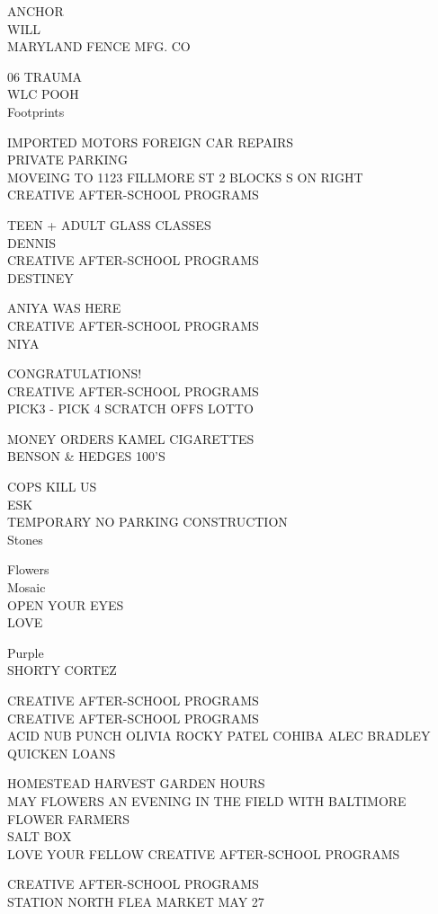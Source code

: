 \documentclass[10pt,letterpaper]{article}
\begin{document}
ANCHOR\\
WILL\\
MARYLAND FENCE MFG. CO

06 TRAUMA\\
WLC POOH\\
Footprints

IMPORTED MOTORS FOREIGN CAR REPAIRS\\
PRIVATE PARKING\\
MOVEING TO 1123 FILLMORE ST 2 BLOCKS S ON RIGHT\\
CREATIVE AFTER{-}SCHOOL PROGRAMS

TEEN + ADULT GLASS CLASSES\\
DENNIS\\
CREATIVE AFTER{-}SCHOOL PROGRAMS\\
DESTINEY

ANIYA WAS HERE\\
CREATIVE AFTER{-}SCHOOL PROGRAMS\\
NIYA

CONGRATULATIONS!\\
CREATIVE AFTER{-}SCHOOL PROGRAMS\\
PICK3 {-} PICK 4 SCRATCH OFFS LOTTO

MONEY ORDERS KAMEL CIGARETTES\\
BENSON \& HEDGES 100'S

COPS KILL US\\
ESK\\
TEMPORARY NO PARKING CONSTRUCTION\\
Stones

Flowers\\
Mosaic\\
OPEN YOUR EYES\\
LOVE

Purple\\
SHORTY CORTEZ

CREATIVE AFTER{-}SCHOOL PROGRAMS\\
CREATIVE AFTER{-}SCHOOL PROGRAMS\\
ACID NUB PUNCH OLIVIA ROCKY PATEL COHIBA ALEC BRADLEY QUICKEN LOANS

HOMESTEAD HARVEST GARDEN HOURS\\
MAY FLOWERS AN EVENING IN THE FIELD WITH BALTIMORE FLOWER FARMERS\\
SALT BOX\\
LOVE YOUR FELLOW CREATIVE AFTER{-}SCHOOL PROGRAMS

CREATIVE AFTER{-}SCHOOL PROGRAMS\\
STATION NORTH FLEA MARKET MAY 27
\end{document}
